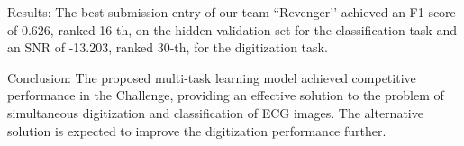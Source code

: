 \documentclass{cinc-abstract}
\newcommand\wordcount{ \currfilepath"}}
\begin{document}
Results: The best submission entry of our team ``Revenger’’ achieved an F1 score of 0.626, ranked 16-th, on the hidden validation set for the classification task and an SNR of -13.203, ranked 30-th, for the digitization task.

Conclusion: The proposed multi-task learning model achieved competitive performance in the Challenge, providing an effective solution to the problem of simultaneous digitization and classification of ECG images. The alternative solution is expected to improve the digitization performance further.


\end{document}
